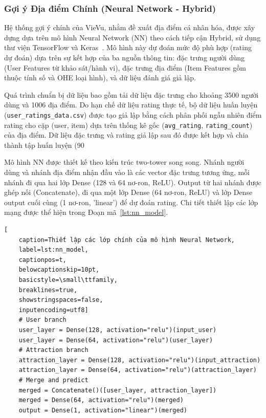 \subsubsection{Gợi ý Địa điểm Chính (Neural Network - Hybrid)}
\label{subsubsec:nn_recsys_impl_paragraph_final} %

Hệ thống gợi ý chính của VieVu, nhằm đề xuất địa điểm cá nhân hóa, được xây dựng dựa trên mô hình Neural Network (NN) theo cách tiếp cận Hybrid, sử dụng thư viện TensorFlow và Keras~\cite{tensorflow_lib, keras_lib}. Mô hình này dự đoán mức độ phù hợp (rating dự đoán) dựa trên sự kết hợp của ba nguồn thông tin: đặc trưng người dùng (User Features từ khảo sát/hành vi), đặc trưng địa điểm (Item Features gồm thuộc tính số và OHE loại hình), và dữ liệu đánh giá giả lập.

Quá trình chuẩn bị dữ liệu bao gồm tải dữ liệu đặc trưng cho khoảng 3500 người dùng và 1006 địa điểm. Do hạn chế dữ liệu rating thực tế, bộ dữ liệu huấn luyện (\texttt{user\_ratings\_data.csv}) được tạo giả lập bằng cách phân phối ngẫu nhiên điểm rating cho cặp (user, item) dựa trên thống kê gốc (\texttt{avg\_rating}, \texttt{rating\_count}) của địa điểm. Dữ liệu đặc trưng và rating giả lập sau đó được kết hợp và chia thành tập huấn luyện (90%

Mô hình NN được thiết kế theo kiến trúc two-tower song song. Nhánh người dùng và nhánh địa điểm nhận đầu vào là các vector đặc trưng tương ứng, mỗi nhánh đi qua hai lớp Dense (128 và 64 nơ-ron, ReLU). Output từ hai nhánh được ghép nối (Concatenate), đi qua một lớp Dense (64 nơ-ron, ReLU) và lớp Dense output cuối cùng (1 nơ-ron, 'linear') để dự đoán rating. Chi tiết thiết lập các lớp mạng được thể hiện trong Đoạn mã~\ref{lst:nn_model}. %

\lstset{language=python}
\begin{lstlisting}[
    caption=Thiết lập các lớp chính của mô hình Neural Network,
    label=lst:nn_model,
    captionpos=t,
    belowcaptionskip=10pt,
    basicstyle=\small\ttfamily,
    breaklines=true,
    showstringspaces=false,
    inputencoding=utf8]
    # User branch
    user_layer = Dense(128, activation="relu")(input_user)
    user_layer = Dense(64, activation="relu")(user_layer)
    # Attraction branch
    attraction_layer = Dense(128, activation="relu")(input_attraction)
    attraction_layer = Dense(64, activation="relu")(attraction_layer)
    # Merge and predict
    merged = Concatenate()([user_layer, attraction_layer])
    merged = Dense(64, activation="relu")(merged)
    output = Dense(1, activation="linear")(merged)
    
\end{lstlisting}

